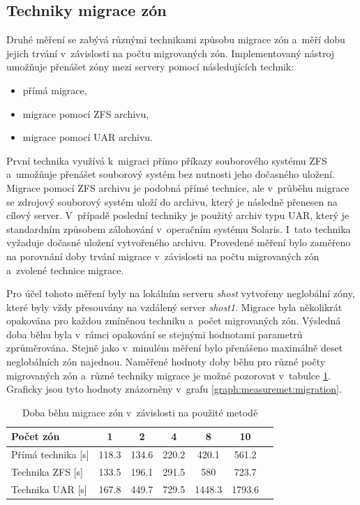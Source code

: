 \subsection{Techniky migrace zón}
\label{chapter:measurement:migration}
Druhé měření se zabývá různými technikami způsobu migrace zón a~měří dobu jejich trvání v~závislosti na počtu migrovaných zón.
Implementovaný nástroj umožňuje přenášet zóny mezi servery pomocí následujících technik:
\begin{itemize}
 \item přímá migrace,
 \item migrace pomocí ZFS archivu,
 \item migrace pomocí UAR archivu.
\end{itemize}
První technika využívá k~migraci přímo příkazy souborového systému ZFS a~umožňuje přenášet souborový systém bez nutnosti jeho dočasného
uložení. Migrace pomocí ZFS archivu je podobná přímé technice, ale v~průběhu migrace se zdrojový souborový systém uloží do archivu,
který je následně přenesen na cílový server. V~případě poslední techniky je použitý archiv typu UAR, který je standardním způsobem zálohování
v~operačním systému Solaris. I~tato technika vyžaduje dočasné uložení vytvořeného archivu. Provedené měření bylo zaměřeno
na porovnání doby trvání migrace v~závislosti na počtu migrovaných zón a~zvolené technice migrace.

Pro účel tohoto měření byly na lokálním serveru \textit{shost} vytvořeny neglobální zóny, které byly vždy přesouvány na vzdálený
server \textit{shost1}. Migrace byla několikrát opakována pro každou zmíněnou techniku a~počet migrovaných zón. Výsledná
doba běhu byla v~rámci opakování se stejnými hodnotami parametrů zprůměrována. Stejně jako v~minulém měření bylo přenášeno maximálně
deset neglobálních zón najednou. Naměřené hodnoty doby běhu pro různé počty migrovaných zón a~různé techniky migrace je možné
pozorovat v~tabulce \ref{table:measuremet:migration}. Graficky jsou tyto hodnoty znázorněny v~grafu \ref{graph:measuremet:migration}.
\begin{table}
  \centering
  \label{table:measuremet:migration}
  \caption{Doba běhu migrace zón v~závislosti na použité metodě}
  \begin{tabular}{ l | c c c c c c}
   Počet zón & 1 & 2 & 4 & 8 & 10 &   \\ \hline
   Přímá technika [s] & 118.3 & 134.6 & 220.2 & 420.1 & 561.2 & \\
   Technika ZFS [s] & 133.5 & 196.1 & 291.5 & 580 & 723.7 & \\
   Technika UAR [s] & 167.8 & 449.7 & 729.5 & 1448.3 & 1793.6 & \\
  \end{tabular}
\end{table}

